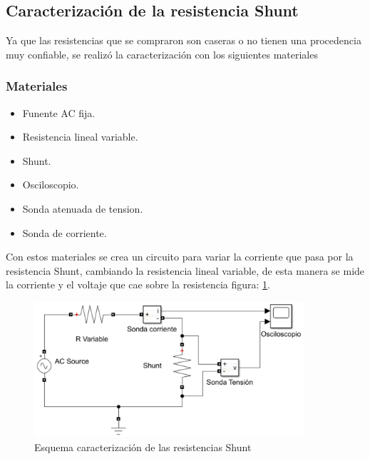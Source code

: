     \subsection{Caracterizaci\'on de la resistencia Shunt}
        Ya que las resistencias que se compraron son caseras o no tienen una procedencia muy confiable, se realizó la caracterización con los siguientes materiales 
        \subsubsection{Materiales}
            \begin{itemize}
                \itemsep0em
                \item Funente AC fija.
                \item Resistencia lineal variable.
                \item Shunt.
                \item Osciloscopio.
                \item Sonda atenuada de tension.
                \item Sonda de corriente.
            \end{itemize}
        Con estos materiales se crea un circuito para variar la corriente que pasa por la resistencia Shunt, cambiando la resistencia lineal variable, de esta manera se mide la corriente y el voltaje que cae sobre la resistencia figura: \ref{fig:EsquemaCtrShunt}.
        
        \begin{figure}[H]
            \begin{center}
                \includegraphics[width = 10cm]{3Proyecto/EsquemaCtrShunt.PNG}
                \caption{ Esquema caracterización de las resistencias Shunt } 
                \label{fig:EsquemaCtrShunt}
            \end{center}
        \end{figure}

